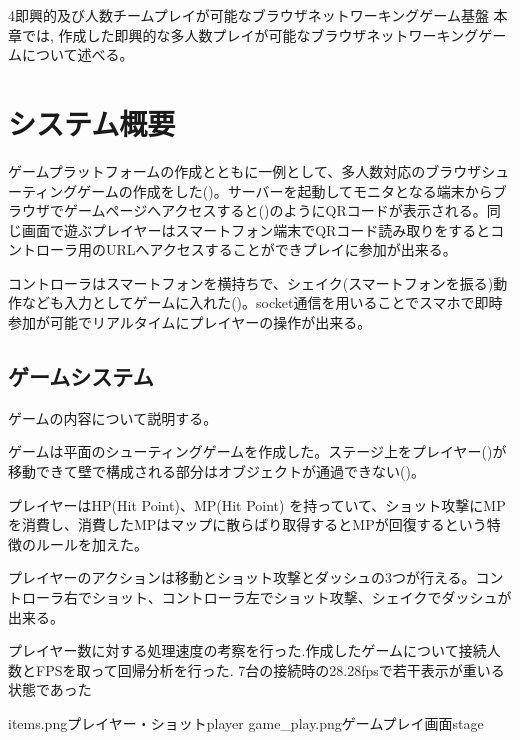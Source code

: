 \chapterhead
{4}{即興的及び人数チームプレイが可能なブラウザネットワーキングゲーム基盤}
{本章では, 作成した即興的な多人数プレイが可能なブラウザネットワーキングゲームについて述べる。}


\section{システム概要}
ゲームプラットフォームの作成とともに一例として、多人数対応のブラウザシューティングゲームの作成をした()。サーバーを起動してモニタとなる端末からブラウザでゲームページへアクセスすると()のようにQRコードが表示される。同じ画面で遊ぶプレイヤーはスマートフォン端末でQRコード読み取りをするとコントローラ用のURLへアクセスすることができプレイに参加が出来る。

コントローラはスマートフォンを横持ちで、シェイク(スマートフォンを振る)動作なども入力としてゲームに入れた()。socket通信\cite{webpagesocketio}を用いることでスマホで即時参加が可能でリアルタイムにプレイヤーの操作が出来る。


\subsection{ゲームシステム}
ゲームの内容について説明する。

ゲームは平面のシューティングゲームを作成した。ステージ上をプレイヤー()が移動できて壁で構成される部分はオブジェクトが通過できない()。

プレイヤーはHP(Hit Point)、MP(Hit Point) を持っていて、ショット攻撃にMPを消費し、消費したMPはマップに散らばり取得するとMPが回復するという特徴のルールを加えた。

プレイヤーのアクションは移動とショット攻撃とダッシュの3つが行える。コントローラ右でショット、コントローラ左でショット攻撃、シェイクでダッシュが出来る。

プレイヤー数に対する処理速度の考察を行った.作成したゲームについて接続人数とFPSを取って回帰分析を行った.
7台の接続時の28.28fpsで若干表示が重いる状態であった

\myfigtwo
{items.png}{プレイヤー・ショット}{player}
{game_play.png}{ゲームプレイ画面}{stage}


